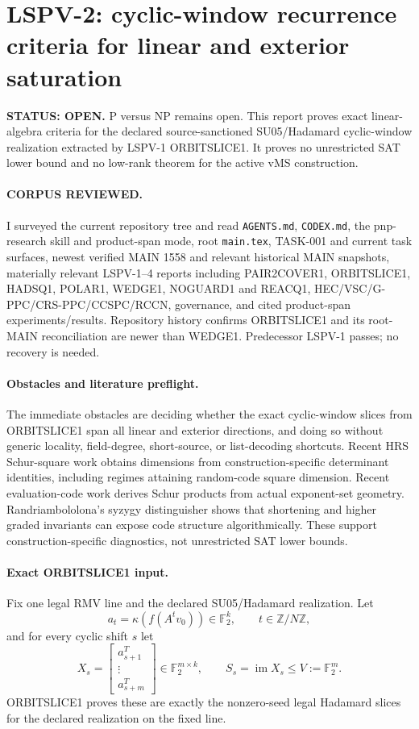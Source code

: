 \documentclass[11pt]{article}
\begin{document}
\section*{LSPV-2: cyclic-window recurrence criteria for linear and exterior saturation}
\textbf{STATUS: OPEN.} P versus NP remains open. This report proves exact linear-algebra criteria for the declared source-sanctioned SU05/Hadamard cyclic-window realization extracted by LSPV-1 ORBITSLICE1. It proves no unrestricted SAT lower bound and no low-rank theorem for the active vMS construction.

\paragraph{CORPUS REVIEWED.}
I surveyed the current repository tree and read \texttt{AGENTS.md}, \texttt{CODEX.md}, the pnp-research skill and product-span mode, root \texttt{main.tex}, TASK-001 and current task surfaces, newest verified MAIN 1558 and relevant historical MAIN snapshots, materially relevant LSPV-1--4 reports including PAIR2COVER1, ORBITSLICE1, HADSQ1, POLAR1, WEDGE1, NOGUARD1 and REACQ1, HEC/VSC/G-PPC/CRS-PPC/CCSPC/RCCN, governance, and cited product-span experiments/results. Repository history confirms ORBITSLICE1 and its root-MAIN reconciliation are newer than WEDGE1. Predecessor LSPV-1 passes; no recovery is needed.

\paragraph{Obstacles and literature preflight.}
The immediate obstacles are deciding whether the exact cyclic-window slices from ORBITSLICE1 span all linear and exterior directions, and doing so without generic locality, field-degree, short-source, or list-decoding shortcuts. Recent HRS Schur-square work obtains dimensions from construction-specific determinant identities, including regimes attaining random-code square dimension. Recent evaluation-code work derives Schur products from actual exponent-set geometry. Randriambololona's syzygy distinguisher shows that shortening and higher graded invariants can expose code structure algorithmically. These support construction-specific diagnostics, not unrestricted SAT lower bounds.

\paragraph{Exact ORBITSLICE1 input.}
Fix one legal RMV line and the declared SU05/Hadamard realization. Let
\[
a_t=\kappa(f(A^tv_0))\in\mathbb F_2^k,\qquad t\in\mathbb Z/N\mathbb Z,
\]
and for every cyclic shift \(s\) let
\[
X_s=\begin{bmatrix}a_{s+1}^{T}\\ \vdots\\ a_{s+m}^{T}\end{bmatrix}\in\mathbb F_2^{m\times k},
\qquad S_s=\operatorname{im}X_s\le V:=\mathbb F_2^m.
\]
ORBITSLICE1 proves these are exactly the nonzero-seed legal Hadamard slices for the declared realization on the fixed line.
\end{document}
